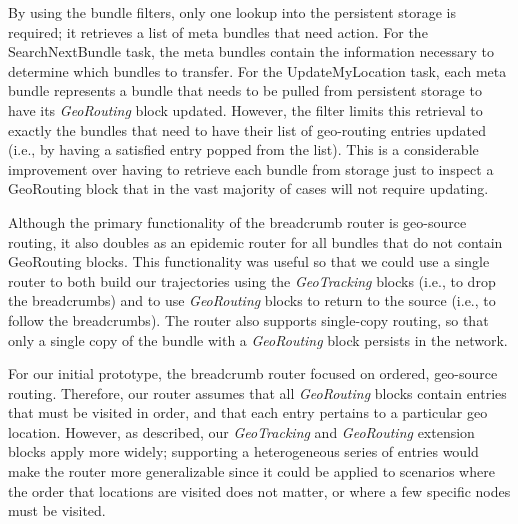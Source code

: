 By using the {\sc bundle filters}, only one lookup into the persistent storage is required; it retrieves a list of {\sc meta bundles} that need action. For the {\sc SearchNextBundle} task, the {\sc meta bundles} contain the information necessary to determine which bundles to transfer. For the {\sc UpdateMyLocation} task, each {\sc meta bundle} represents a bundle that needs to be pulled from persistent storage to have its {\em GeoRouting} block updated. However, the filter limits this retrieval to exactly the bundles that need to have their list of geo-routing entries updated (i.e., by having a satisfied entry popped from the list). This is a considerable improvement over having to retrieve each bundle from storage just to inspect a {\sc GeoRouting} block that in the vast majority of cases will not require updating.

Although the primary functionality of the {\sc breadcrumb} router is geo-source routing, it also doubles as an epidemic router for all bundles that do not contain {\sc GeoRouting} blocks. This functionality was useful so that we could use a single router to both build our trajectories using the {\em GeoTracking} blocks (i.e., to drop the breadcrumbs) and to use {\em GeoRouting} blocks to return to the source (i.e., to follow the breadcrumbs). The router also supports single-copy routing, so that only a single copy of the bundle with a {\em GeoRouting} block persists in the network.

For our initial prototype, the {\sc breadcrumb} router focused on ordered, geo-source routing. Therefore, our router assumes that all {\em GeoRouting} blocks contain entries that must be visited in order, and that each entry pertains to a particular geo location. However, as described, our {\em GeoTracking} and {\em GeoRouting} extension blocks apply more widely; supporting a heterogeneous series of entries would make the router more generalizable since it could be applied to scenarios where the order that locations are visited does not matter, or where a few specific nodes must be visited.


